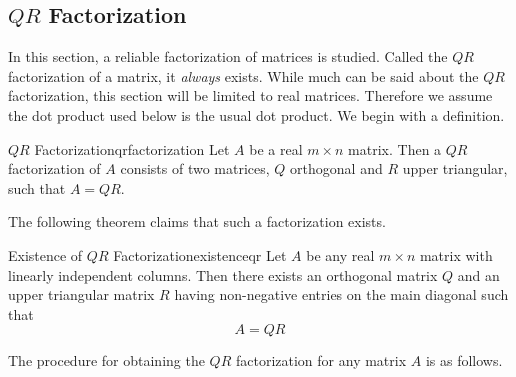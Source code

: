 \subsection{$QR$ Factorization}

In this section, a reliable factorization of matrices is studied. Called the $QR$ factorization of a matrix, it \textit{always} exists. While much can be said about the $QR$ factorization, this section will be limited to real matrices. Therefore we assume the dot product used below is the usual dot product. We begin with a definition. 

\begin{definition}{$QR$ Factorization}{qrfactorization}
Let $A$ be a real $m\times n$ matrix. Then a $QR$ factorization of $A$ consists
of two matrices, $Q$ orthogonal and $R$ upper
triangular, such that $A=QR.$ 
\end{definition}

The following theorem claims that such a factorization exists. 

\begin{theorem}{Existence of $QR$ Factorization}{existenceqr}
Let $A$ be any real $m\times n$ matrix with linearly independent columns. Then there exists an orthogonal
matrix $Q$ and an upper triangular matrix $R$ having non-negative entries
on the main diagonal such that
\begin{equation*}
A=QR
\end{equation*}
\end{theorem}

The procedure for obtaining the $QR$ factorization for any matrix $A$ is as follows.

